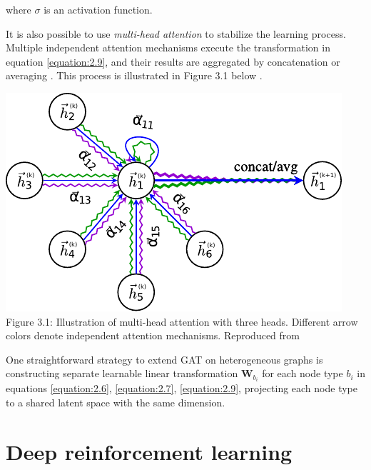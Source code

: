 where $\sigma$ is an activation function. 
\par
It is also possible to use \textit{multi-head attention} to stabilize the learning process. Multiple independent attention mechanisms execute the transformation in equation \ref{equation:2.9}, and their results are aggregated by concatenation or averaging \cite{veličković2018graph}. This process is illustrated in Figure 3.1 below \cite{veličković2018graph}.
\begin{center}
    \includegraphics[width=0.5\linewidth]{images/graph_attention_network_pdfa.pdf}\\
	Figure 3.1: Illustration of multi-head attention with three heads. Different arrow colors denote independent attention mechanisms. Reproduced from \cite{veličković2018graph}
\end{center}
\par
One straightforward strategy to extend GAT on heterogeneous graphs is constructing separate learnable linear transformation $\boldsymbol{W}_{b_i}$ for each node type $b_i$ in equations \ref{equation:2.6}, \ref{equation:2.7}, \ref{equation:2.9}, projecting each node type to a shared latent space with the same dimension.

\section{Deep reinforcement learning}


